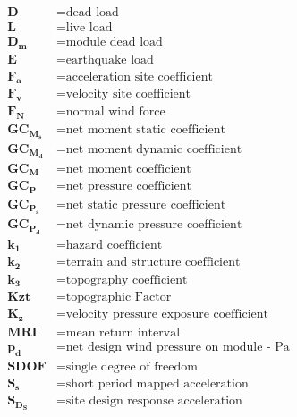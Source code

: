 \begin{align*}
    \bm{D}       & = \textrm{dead load}                               \\
    \bm{L}       & = \textrm{live load}                               \\                 
    \bm{D_m}     & = \textrm{module dead load}                        \\
    \bm{E}       & = \textrm{earthquake load}                         \\
    \bm{F_a}     & = \textrm{acceleration site coefficient}           \\
    \bm{F_v}     & = \textrm{velocity site coefficient}               \\
    \bm{F_N}     & = \textrm{normal wind force}                       \\
    \bm{GC_M_s}  & = \textrm{net moment static coefficient}           \\
    \bm{GC_M_d}  & = \textrm{net moment dynamic coefficient}          \\
    \bm{GC_M}    & = \textrm{net moment coefficient}                  \\
    \bm{GC_P}    & = \textrm{net pressure coefficient}                \\
    \bm{GC_P_s}  & = \textrm{net static pressure coefficient}         \\
    \bm{GC_P_d}  & = \textrm{net dynamic pressure coefficient}        \\
    \bm{k_1}     & = \textrm{hazard coefficient}                      \\
    \bm{k_2}     & = \textrm{terrain and structure coefficient}       \\
    \bm{k_3}     & = \textrm{topography coefficient}                  \\
    \bm{Kzt}     & = \textrm{topographic Factor}                      \\
    \bm{K_z}     & = \textrm{velocity pressure exposure coefficient}  \\
    \bm{MRI}     & = \textrm{mean return interval}                    \\
    \bm{p_d}     & = \textrm{net design wind pressure on module - Pa} \\
    \bm{SDOF}    & = \textrm{single degree of freedom}                \\
    \bm{S_s}     & = \textrm{short period mapped acceleration}        \\
    \bm{S_D_S}   & = \textrm{site design response acceleration}       \\

\end{align*}
